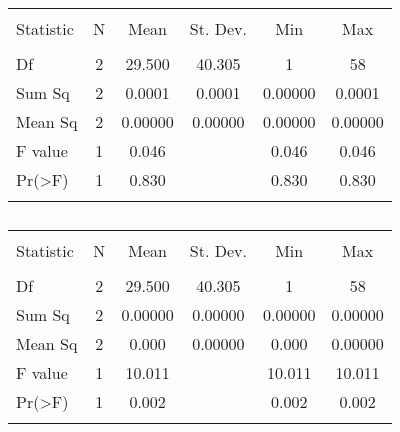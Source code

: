 \begin{table}[!htbp] \centering 
  \caption{} 
  \label{} 
\begin{tabular}{@{\extracolsep{5pt}}lccccc} 
\\[-1.8ex]\hline 
\hline \\[-1.8ex] 
Statistic & \multicolumn{1}{c}{N} & \multicolumn{1}{c}{Mean} & \multicolumn{1}{c}{St. Dev.} & \multicolumn{1}{c}{Min} & \multicolumn{1}{c}{Max} \\ 
\hline \\[-1.8ex] 
Df & 2 & 29.500 & 40.305 & 1 & 58 \\ 
Sum Sq & 2 & 0.0001 & 0.0001 & 0.00000 & 0.0001 \\ 
Mean Sq & 2 & 0.00000 & 0.00000 & 0.00000 & 0.00000 \\ 
F value & 1 & 0.046 &  & 0.046 & 0.046 \\ 
Pr(\textgreater F) & 1 & 0.830 &  & 0.830 & 0.830 \\ 
\hline \\[-1.8ex] 
\end{tabular} 
\end{table} 

\begin{table}[!htbp] \centering 
  \caption{} 
  \label{} 
\begin{tabular}{@{\extracolsep{5pt}}lccccc} 
\\[-1.8ex]\hline 
\hline \\[-1.8ex] 
Statistic & \multicolumn{1}{c}{N} & \multicolumn{1}{c}{Mean} & \multicolumn{1}{c}{St. Dev.} & \multicolumn{1}{c}{Min} & \multicolumn{1}{c}{Max} \\ 
\hline \\[-1.8ex] 
Df & 2 & 29.500 & 40.305 & 1 & 58 \\ 
Sum Sq & 2 & 0.00000 & 0.00000 & 0.00000 & 0.00000 \\ 
Mean Sq & 2 & 0.000 & 0.00000 & 0.000 & 0.00000 \\ 
F value & 1 & 10.011 &  & 10.011 & 10.011 \\ 
Pr(\textgreater F) & 1 & 0.002 &  & 0.002 & 0.002 \\ 
\hline \\[-1.8ex] 
\end{tabular} 
\end{table} 
